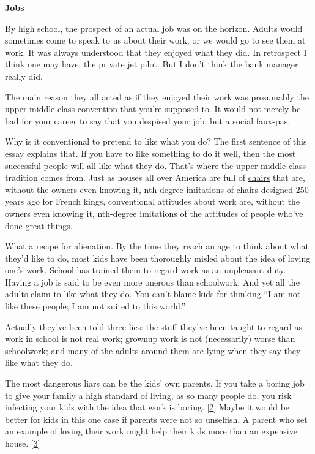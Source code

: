 \textbf{Jobs}

By high school, the prospect of an actual job was on the horizon. Adults
would sometimes come to speak to us about their work, or we would go to
see them at work. It was always understood that they enjoyed what they
did. In retrospect I think one may have: the private jet pilot. But I
don't think the bank manager really did.

The main reason they all acted as if they enjoyed their work was
presumably the upper-middle class convention that you're supposed to. It
would not merely be bad for your career to say that you despised your
job, but a social faux-pas.

Why is it conventional to pretend to like what you do? The first
sentence of this essay explains that. If you have to like something to
do it well, then the most successful people will all like what they do.
That's where the upper-middle class tradition comes from. Just as houses
all over America are full of
\href{http://images.google.com/images?q=louis\%20xv\%20chair}{chairs}
that are, without the owners even knowing it, nth-degree imitations of
chairs designed 250 years ago for French kings, conventional attitudes
about work are, without the owners even knowing it, nth-degree
imitations of the attitudes of people who've done great things.

What a recipe for alienation. By the time they reach an age to think
about what they'd like to do, most kids have been thoroughly misled
about the idea of loving one's work. School has trained them to regard
work as an unpleasant duty. Having a job is said to be even more onerous
than schoolwork. And yet all the adults claim to like what they do. You
can't blame kids for thinking ``I am not like these people; I am not
suited to this world.''

Actually they've been told three lies: the stuff they've been taught to
regard as work in school is not real work; grownup work is not
(necessarily) worse than schoolwork; and many of the adults around them
are lying when they say they like what they do.

The most dangerous liars can be the kids' own parents. If you take a
boring job to give your family a high standard of living, as so many
people do, you risk infecting your kids with the idea that work is
boring. {[}\hyperref[f2n]{2}{]} Maybe it would be better for kids in
this one case if parents were not so unselfish. A parent who set an
example of loving their work might help their kids more than an
expensive house. {[}\hyperref[f3n]{3}{]}

